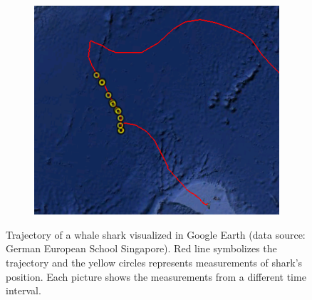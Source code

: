 \documentclass[a4paper,12pt,oneside]{book}
\begin{document}
\begin{figure}[ht]
\begin{subfigure}[ht]{0.3\textwidth}
    \end{subfigure}
    \begin{subfigure}[ht]{0.3\textwidth}
    \centering
        \includegraphics[width=\textwidth]{./images/shark_move_3.png}
    \label{fig:shark3}
    \end{subfigure}
\caption[Trajectory of a whale shark visualized in Google Earth]
{Trajectory of a whale shark visualized in Google Earth
(data source: German European School Singapore).
Red line symbolizes the trajectory and the yellow circles represents measurements of shark's position.
Each picture shows the measurements from a different time interval.}
\label{fig:shark}
\end{figure}

\end{document}
